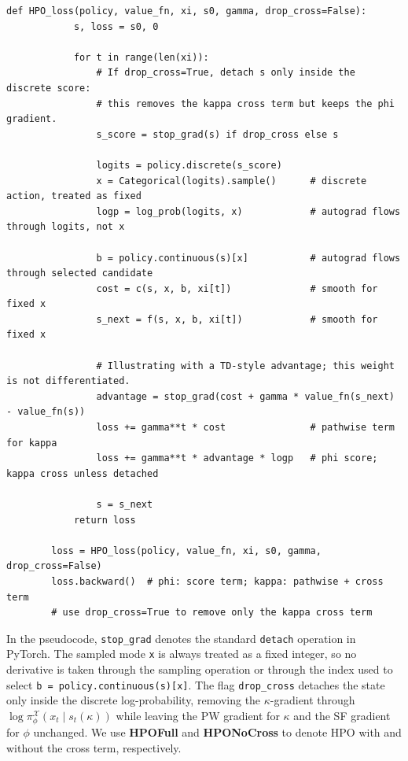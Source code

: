 \documentclass{article}
\theoremstyle{definition}
\theoremstyle{remark}
\begin{document}
    \begin{lstlisting}[style=hpo,caption={Hybrid policy optimization gradient estimation.},label={alg:hpo-loss}]
        def HPO_loss(policy, value_fn, xi, s0, gamma, drop_cross=False):
            s, loss = s0, 0
        
            for t in range(len(xi)):
                # If drop_cross=True, detach s only inside the discrete score:
                # this removes the kappa cross term but keeps the phi gradient.
                s_score = stop_grad(s) if drop_cross else s
        
                logits = policy.discrete(s_score)
                x = Categorical(logits).sample()      # discrete action, treated as fixed
                logp = log_prob(logits, x)            # autograd flows through logits, not x
        
                b = policy.continuous(s)[x]           # autograd flows through selected candidate
                cost = c(s, x, b, xi[t])              # smooth for fixed x
                s_next = f(s, x, b, xi[t])            # smooth for fixed x
        
                # Illustrating with a TD-style advantage; this weight is not differentiated.
                advantage = stop_grad(cost + gamma * value_fn(s_next) - value_fn(s))
                loss += gamma**t * cost               # pathwise term for kappa
                loss += gamma**t * advantage * logp   # phi score; kappa cross unless detached
    
                s = s_next
            return loss
        
        loss = HPO_loss(policy, value_fn, xi, s0, gamma, drop_cross=False)
        loss.backward()  # phi: score term; kappa: pathwise + cross term
        # use drop_cross=True to remove only the kappa cross term
        \end{lstlisting}

        In the pseudocode, \texttt{stop\_grad} denotes the standard \texttt{detach} operation 
in PyTorch. The sampled mode \texttt{x} is always treated as a fixed integer, so no 
derivative is taken through the sampling operation or through the index used to select 
\texttt{b = policy.continuous(s)[x]}. The flag \texttt{drop\_cross} detaches the state 
only inside the discrete log-probability, removing the $\kappa$-gradient through 
$\log\pi^{\mathcal{X}}_\phi(x_t\mid s_t(\kappa))$ while leaving the PW 
gradient for $\kappa$ and the SF gradient for $\phi$ unchanged. We use \textbf{HPOFull}  and \textbf{HPONoCross} to denote HPO  with and without the cross term, respectively. 
\end{document}
